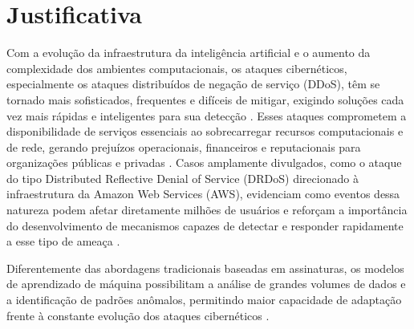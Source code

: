 \documentclass[
    12pt,                %
    openright,           %
    oneside,             %
    a4paper,             %
    english,             %
    brazil               %
]{abntex2}
\begin{document}

\section{Justificativa}
\label{sec:justificativa}

Com a evolução da infraestrutura da inteligência artificial e o aumento da complexidade dos ambientes computacionais, os ataques cibernéticos, especialmente os ataques distribuídos de negação de serviço (DDoS), têm se tornado mais sofisticados, frequentes e difíceis de mitigar, exigindo soluções cada vez mais rápidas e inteligentes para sua detecção \cite{Thaqi2026}. Esses ataques comprometem a disponibilidade de serviços essenciais ao sobrecarregar recursos computacionais e de rede, gerando prejuízos operacionais, financeiros e reputacionais para organizações públicas e privadas \cite{Ouhssini2024}. Casos amplamente divulgados, como o ataque do tipo Distributed Reflective Denial of Service (DRDoS) direcionado à infraestrutura da Amazon Web Services (AWS), evidenciam como eventos dessa natureza podem afetar diretamente milhões de usuários e reforçam a importância do desenvolvimento de mecanismos capazes de detectar e responder rapidamente a esse tipo de ameaça \cite{Subramani2020}.
 
Diferentemente das abordagens tradicionais baseadas em assinaturas, os modelos de aprendizado de máquina possibilitam a análise de grandes volumes de dados e a identificação de padrões anômalos, permitindo maior
capacidade de adaptação frente à constante evolução dos ataques cibernéticos \cite{Ouhssini2024}. 
\end{document}
